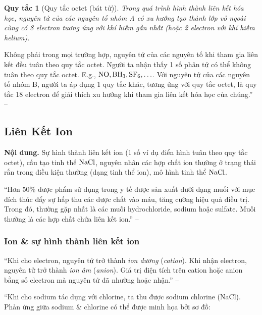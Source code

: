 \documentclass{article}
\numberwithin{equation}{section}
\newtheorem{quytac}{Quy tắc}[section]
\begin{document}
\begin{quytac}[Quy tắc octet (bát tử)]
	Trong quá trình hình thành liên kết hóa học, nguyên tử của các nguyên tố nhóm A có xu hướng tạo thành lớp vỏ ngoài cùng có 8 electron tương ứng với khí hiếm gần nhất (hoặc 2 electron với khí hiếm helium).
\end{quytac}
Không phải trong mọi trường hợp, nguyên tử của các nguyên tố khi tham gia liên kết đều tuân theo quy tắc octet. Người ta nhận thấy 1 số phân tử có thể không tuân theo quy tắc octet. E.g., $\rm NO,BH_3,SF_6,\ldots$. Với nguyên tử của các nguyên tố nhóm B, người ta áp dụng 1 quy tắc khác, tương ứng với quy tắc octet, là quy tắc 18 electron để giải thích xu hướng khi tham gia liên kết hóa học của chúng.'' -- \cite[pp. 53--54]{SGK_Hoa_Hoc_10_Chan_Troi_Sang_Tao}


\subsection{Liên Kết Ion}
\textsf{\textbf{Nội dung.} Sự hình thành liên kết ion (1 số ví dụ điển hình tuân theo quy tắc octet), cấu tạo tinh thể $\rm NaCl$, nguyên nhân các hợp chất ion thường ở trạng thái rắn trong điều kiện thường (dạng tinh thể ion), mô hình tinh thể $\rm NaCl$.}

``Hơn 50\% dược phẩm sử dụng trong y tế được sản xuất dưới dạng muối với mục đích thúc đẩy sự hấp thu các dược chất vào máu, tăng cường hiệu quả điều trị. Trong đó, thường gặp nhất là các muối hydrochloride, sodium hoặc sulfate. Muối thường là các hợp chất chứa liên kết ion.'' -- \cite[p. 55]{SGK_Hoa_Hoc_10_Chan_Troi_Sang_Tao}

\subsubsection{Ion \& sự hình thành liên kết ion}
``Khi cho electron, nguyên tử trở thành \textit{ion dương} (\textit{cation}). Khi nhận electron, nguyên tử trở thành \textit{ion âm} (\textit{anion}). Giá trị điện tích trên cation hoặc anion bằng số electron mà nguyên tử đã nhường hoặc nhận.'' -- \cite[p. 55]{SGK_Hoa_Hoc_10_Chan_Troi_Sang_Tao}

``Khi cho sodium tác dụng với chlorine, ta thu được sodium chlorine (NaCl). Phản ứng giữa sodium \& chlorine có thể được minh họa bởi sơ đồ:
\end{document}

